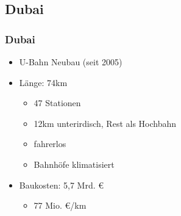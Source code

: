 \documentclass[xcolor=dvipsnames]{beamer}
\begin{document}

\subsection{Dubai}
\begin{frame}
  \frametitle{Dubai}

  \begin{itemize}
  \item U-Bahn Neubau (seit 2005)
  \item Länge: 74km
    \begin{itemize}
    \item 47 Stationen
    \item 12km unterirdisch, Rest als Hochbahn
    \item fahrerlos
    \item Bahnhöfe klimatisiert
    \end{itemize}
  \item Baukosten: 5,7 Mrd. €
    \begin{itemize}
    \item 77 Mio. €/km
    \end{itemize}
  \end{itemize}
\end{frame}

\end{document}
